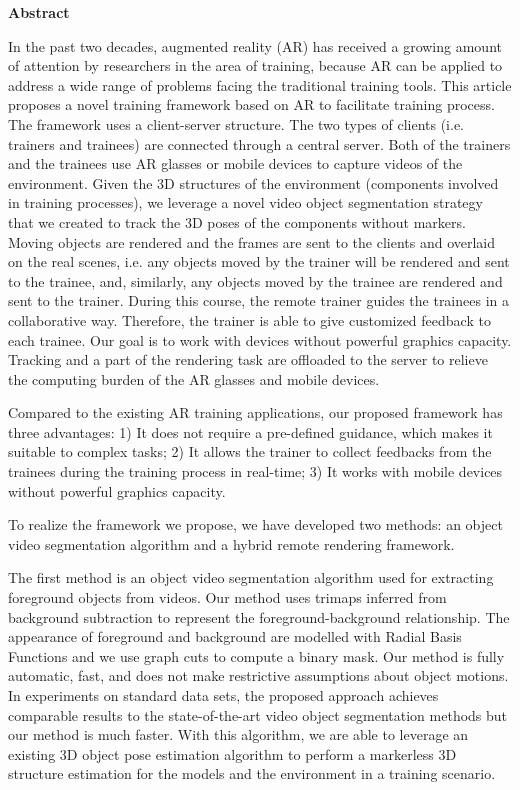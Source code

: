 
\begin{center}\textbf{Abstract}\end{center}

In the past two decades, augmented reality (AR) has received a growing amount of attention by researchers in the area of training, because AR can be applied to address a wide range of problems facing the traditional training tools.
This article proposes a novel training framework based on AR to facilitate training process.
The framework uses a client-server structure. The two types of clients (i.e. trainers and trainees) are connected through a central server.
Both of the trainers and the trainees use AR glasses or mobile devices to capture videos of the environment.
Given the 3D structures of the environment (components involved in training processes), we leverage a novel video object segmentation strategy that we created to track the 3D poses of the components without markers.
Moving objects are rendered and the frames are sent to the clients and overlaid on the real scenes, i.e. any objects moved by the trainer will be rendered and sent to the trainee, and, similarly, any objects moved by the trainee are rendered and sent to the trainer.
During this course, the remote trainer guides the trainees in a collaborative way. Therefore, the trainer is able to give customized feedback to each trainee.
Our goal is to work with devices without powerful graphics capacity. Tracking and a part of the rendering task are offloaded to the server to relieve the computing burden of the AR glasses and mobile devices.

Compared to the existing AR training applications, our proposed framework has three advantages:
1) It does not require a pre-defined guidance, which makes it suitable to complex tasks;
2) It allows the trainer to collect feedbacks from the trainees during the training process in real-time;
3) It works with mobile devices without powerful graphics capacity.

To realize the framework we propose, we have developed two methods: an object video segmentation algorithm and a hybrid remote rendering framework.

The first method is an object video segmentation algorithm used for extracting foreground objects from videos. Our method uses trimaps inferred from background subtraction to represent the foreground-background relationship. The appearance of foreground and background are modelled with Radial Basis Functions and we use graph cuts to compute a binary mask. Our method is fully automatic, fast, and does not make restrictive assumptions about object motions. In experiments on standard data sets, the proposed approach achieves comparable results to the state-of-the-art video object segmentation methods but our method is much faster.
With this algorithm, we are able to leverage an existing 3D object pose estimation algorithm to perform a markerless
3D structure estimation for the models and the environment in a training scenario.

